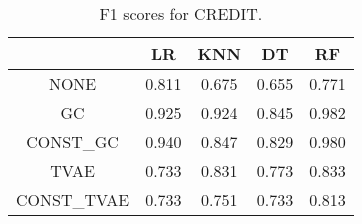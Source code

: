 \begin{table}
\caption{F1 scores for CREDIT.}
\label{tab:f1-CREDIT}
\begin{tabular}{ccccc}
\toprule
 & LR & KNN & DT & RF \\
\midrule
NONE & 0.811 & 0.675 & 0.655 & 0.771 \\
GC & 0.925 & 0.924 & 0.845 & 0.982 \\
CONST\_GC & 0.940 & 0.847 & 0.829 & 0.980 \\
TVAE & 0.733 & 0.831 & 0.773 & 0.833 \\
CONST\_TVAE & 0.733 & 0.751 & 0.733 & 0.813 \\
\bottomrule
\end{tabular}
\end{table}
